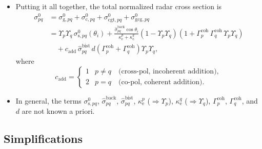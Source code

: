 \documentclass[11pt, oneside]{article}
\newcommand{\ke}[1]{\kappa_\mathrm{e}^{#1}}
\newcommand{\sback}{\hat{\sigma}^\mathrm{back}_{pq}}
\newcommand{\sbist}{\hat{\sigma}^\mathrm{bist}_{pq}}
\newcommand{\Gc}[1]{\Gamma_{#1}^\mathrm{coh}}
\begin{document}
\begin{itemize}
	\item[$\bigstar$] Putting it all together, the total normalized radar cross section is
	\begin{align}
		\sigma^0_{pq} &= \sigma^0_{\mathrm{g},pq} + \sigma^0_{\mathrm{c},pq} + \sigma^0_{\mathrm{cgt},pq} + \sigma^0_{\mathrm{gcg},pq} \nonumber\\
		&= \Upsilon_p\Upsilon_q\,\sigma^0_{\mathrm{s},pq}(\theta_i) + \frac{\sback\cos\theta_i}{\ke{p}+\ke{q}}\left(1 - \Upsilon_p\Upsilon_q\right)\left(1 + \Gc{p}\,\Gc{q}\,\Upsilon_p\Upsilon_q\right) \nonumber\\
		&\quad + c_\mathrm{add}\,\sbist\,d\left(\Gc{p} + \Gc{q}\right)\Upsilon_p\Upsilon_q, \label{e:total}
	\end{align}
	where
	\begin{equation*}
		c_\mathrm{add} = \begin{cases} 1 & p \ne q \quad \text{(cross-pol, incoherent addition)},\\ 2 & p = q \quad \text{(co-pol, coherent addition)}.\end{cases}
	\end{equation*}
	\item[] In general, the terms $\sigma^0_{\mathrm{s},pq}$, $\sback$, $\sbist$, $\ke{p}$ ($\Rightarrow\Upsilon_p$), $\ke{q}$ ($\Rightarrow\Upsilon_q$), $\Gc{p}$, $\Gc{q}$, and $d$ are not known a priori.
\end{itemize}

\subsection{Simplifications}
\label{s:simp}
\end{document}
